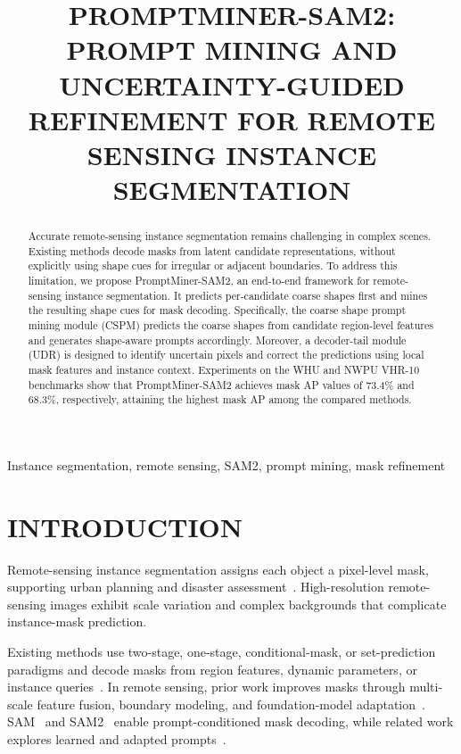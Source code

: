 \documentclass{article}
\title{PROMPTMINER-SAM2: PROMPT MINING AND UNCERTAINTY-GUIDED REFINEMENT FOR REMOTE SENSING INSTANCE SEGMENTATION}
\begin{document}
\maketitle

\begin{abstract}
Accurate remote-sensing instance segmentation remains challenging in complex scenes.
Existing methods decode masks from latent candidate representations, without explicitly using shape cues for irregular or adjacent boundaries.
To address this limitation, we propose PromptMiner-SAM2, an end-to-end framework for remote-sensing instance segmentation.
It predicts per-candidate coarse shapes first and mines the resulting shape cues for mask decoding.
Specifically, the coarse shape prompt mining module (CSPM) predicts the coarse shapes from candidate region-level features and generates shape-aware prompts accordingly.
Moreover, a decoder-tail module (UDR) is designed to identify uncertain pixels and correct the predictions using local mask features and instance context.
Experiments on the WHU and NWPU VHR-10 benchmarks show that PromptMiner-SAM2 achieves
mask AP values of 73.4\% and 68.3\%, respectively, attaining the highest mask AP among the compared methods.
\end{abstract}
\begin{keywords}
Instance segmentation, remote sensing, SAM2, prompt mining, mask refinement
\end{keywords}

\section{INTRODUCTION}

Remote-sensing instance segmentation assigns each object a pixel-level mask, supporting urban planning and disaster assessment~\cite{rsiisn,p2pformer}.
High-resolution remote-sensing images exhibit scale variation and complex backgrounds that complicate instance-mask prediction.

Existing methods use two-stage, one-stage, conditional-mask, or set-prediction paradigms and decode masks from region features, dynamic parameters, or instance queries~\cite{maskrcnn,msrcnn,htc,condinst,mask2former}.
In remote sensing, prior work improves masks through multi-scale feature fusion, boundary modeling, and foundation-model adaptation~\cite{rsiisn,p2pformer,rs4d,directsamrs,sopseg}. 
SAM~\cite{sam} and SAM2~\cite{sam2} enable prompt-conditioned mask decoding, while related work explores learned and adapted prompts~\cite{rsprompter,pasam,airwaysam,rs2sam2}.
\end{document}
